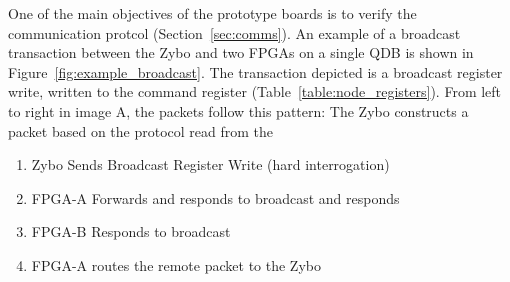 One of the main objectives of the prototype boards is to verify the communication protcol (Section~\ref{sec:comms}).
An example of a broadcast transaction between the Zybo and two FPGAs on a single QDB is shown in Figure~\ref{fig:example_broadcast}.
The transaction depicted is a broadcast register write, written to the command register (Table~\ref{table:node_registers}).
From left to right in image A, the packets follow this pattern:
The Zybo constructs a packet based on the protocol read from the 

\begin{enumerate}
  \item Zybo Sends Broadcast Register Write (hard interrogation)
  \item FPGA-A Forwards and responds to broadcast and responds
  \item FPGA-B Responds to broadcast 
  \item FPGA-A routes the remote packet to the Zybo
\end{enumerate}

